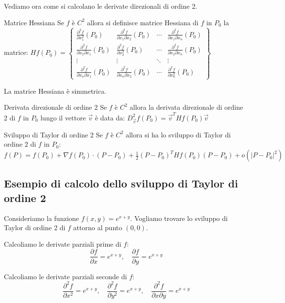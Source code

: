 Vediamo ora come si calcolano le derivate direzionali di ordine 2.
\begin{definizione}{Matrice Hessiana}
  Se $f$ è $C^2$ allora si definisce matrice Hessiana di $f$ in $P_0$ la matrice:
  $Hf(P_0)=\begin{Bmatrix}
    \frac{\partial^2 f}{\partial x_1^2}(P_0) & \frac{\partial^2 f}{\partial x_1 \partial x_2}(P_0) & \cdots & \frac{\partial^2 f}{\partial x_1 \partial x_n}(P_0)\\
    \frac{\partial^2 f}{\partial x_2 \partial x_1}(P_0) & \frac{\partial^2 f}{\partial x_2^2}(P_0) & \cdots & \frac{\partial^2 f}{\partial x_2 \partial x_n}(P_0)\\
    \vdots & \vdots & \ddots & \vdots\\
    \frac{\partial^2 f}{\partial x_n \partial x_1}(P_0) & \frac{\partial^2 f}{\partial x_n \partial x_2}(P_0) & \cdots & \frac{\partial^2 f}{\partial x_n^2}(P_0)
  \end{Bmatrix}$
\end{definizione}
\begin{osservazione}{}
  La matrice Hessiana è simmetrica.
\end{osservazione}

\begin{definizione}{Derivata direzionale di ordine 2}
  Se $f$ è $C^2$ allora la derivata direzionale di ordine 2 di $f$ in $P_0$ lungo il vettore $\vec v$ è data da:
  $D^2_{\vec v}f(P_0)=\vec v^T Hf(P_0) \vec v$
\end{definizione}

\begin{teorema}{Sviluppo di Taylor di ordine 2}
  Se $f$ è $C^2$ allora si ha lo sviluppo di Taylor di ordine 2 di $f$ in $P_0$:
  $f(P) = f(P_0) + \nabla f(P_0) \cdot (P - P_0) + \frac{1}{2} (P - P_0)^T Hf(P_0) (P - P_0) + o(|P - P_0|^2)$
\end{teorema}

\subsection{Esempio di calcolo dello sviluppo di Taylor di ordine 2}
Consideriamo la funzione $f(x,y) = e^{x+y}$. Vogliamo trovare lo sviluppo di Taylor di ordine 2 di $f$ attorno al punto $(0,0)$.

Calcoliamo le derivate parziali prime di $f$:
\[
\frac{\partial f}{\partial x} = e^{x+y}, \quad \frac{\partial f}{\partial y} = e^{x+y}
\]

Calcoliamo le derivate parziali seconde di $f$:
\[
\frac{\partial^2 f}{\partial x^2} = e^{x+y}, \quad \frac{\partial^2 f}{\partial y^2} = e^{x+y}, \quad \frac{\partial^2 f}{\partial x \partial y} = e^{x+y}
\]

